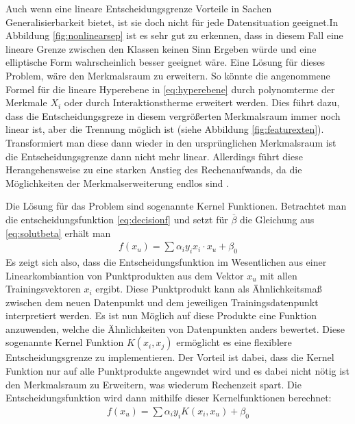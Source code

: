 \documentclass[
]{article}
\begin{document}
Auch wenn eine lineare Entscheidungsgrenze Vorteile in Sachen
Generalisierbarkeit bietet, ist sie doch nicht für jede Datensituation
geeignet.In Abbildung \ref{fig:nonlinearsep} ist es sehr gut zu
erkennen, dass in diesem Fall eine lineare Grenze zwischen den Klassen
keinen Sinn Ergeben würde und eine elliptische Form wahrscheinlich
besser geeignet wäre. Eine Lösung für dieses Problem, wäre den
Merkmalsraum zu erweitern. So könnte die angenommene Formel für die
lineare Hyperebene in \eqref{eq:hyperebene} durch polynomterme der
Merkmale \(X_i\) oder durch Interaktionstherme erweitert werden. Dies
führt dazu, dass die Entscheidungsgreze in diesem vergrößerten
Merkmalsraum immer noch linear ist, aber die Trennung möglich ist (siehe
Abbildung \ref{fig:featurexten}). Transformiert man diese dann wieder in
den ursprünglichen Merkmalsraum ist die Entscheidungsgrenze dann nicht
mehr linear. Allerdings führt diese Herangehensweise zu eine starken
Anstieg des Rechenaufwands, da die Möglichkeiten der Merkmalserweiterung
endlos sind \parencite{jamesIntroductionStatisticalLearning2021}.

Die Lösung für das Problem sind sogenannte Kernel Funktionen. Betrachtet
man die entscheidungsfunktion \eqref{eq:decisionf} und setzt für
\(\overline{\beta}\) die Gleichung aus \eqref{eq:solutbeta} erhält man
\begin{align}
f(x_u)= \sum \alpha_i y_i x_i \cdot x_u +\beta_0
\end{align} Es zeigt sich also, dass die Entscheidungsfunktion im
Wesentlichen aus einer Linearkombiantion von Punktprodukten aus dem
Vektor \(x_u\) mit allen Trainingsvektoren \(x_i\) ergibt. Diese
Punktprodukt kann als Ähnlichkeitsmaß zwischen dem neuen Datenpunkt und
dem jeweiligen Trainingsdatenpunkt interpretiert werden. Es ist nun
Möglich auf diese Produkte eine Funktion anzuwenden, welche die
Ähnlichkeiten von Datenpunkten anders bewertet. Diese sogenannte Kernel
Funktion \(K(x_i,x_j)\) ermöglicht es eine flexiblere
Entscheidungsgrenze zu implementieren. Der Vorteil ist dabei, dass die
Kernel Funktion nur auf alle Punktprodukte angewndet wird und es dabei
nicht nötig ist den Merkmalsraum zu Erweitern, was wiederum Rechenzeit
spart\parencite{jamesIntroductionStatisticalLearning2021}. Die
Entscheidungsfunktion wird dann mithilfe dieser Kernelfunktionen
berechnet: \begin{align}
  f(x_u)=\sum \alpha_i y_i K(x_i,x_u)+\beta_0
\end{align}
\end{document}
